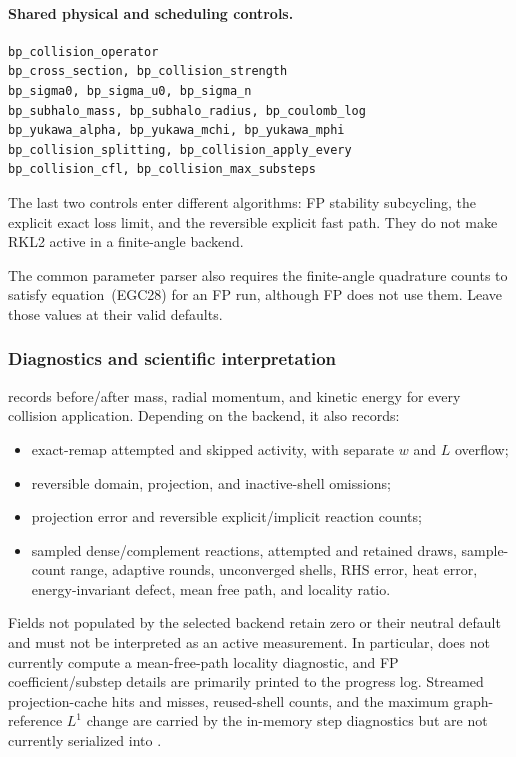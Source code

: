 \paragraph{Shared physical and scheduling controls.}
\begin{lstlisting}
bp_collision_operator
bp_cross_section, bp_collision_strength
bp_sigma0, bp_sigma_u0, bp_sigma_n
bp_subhalo_mass, bp_subhalo_radius, bp_coulomb_log
bp_yukawa_alpha, bp_yukawa_mchi, bp_yukawa_mphi
bp_collision_splitting, bp_collision_apply_every
bp_collision_cfl, bp_collision_max_substeps
\end{lstlisting}
The last two controls enter different algorithms: FP stability subcycling,
the explicit exact loss limit, and the reversible explicit fast path.  They
do not make RKL2 active in a finite-angle backend.

The common parameter parser also requires the finite-angle quadrature counts
to satisfy equation~(EGC28) for an FP run, although FP does not use them.
Leave those values at their valid defaults.

\subsubsection{Diagnostics and scientific interpretation}

 records before/after mass, radial momentum,
and kinetic energy for every collision application.  Depending on the
backend, it also records:
\begin{itemize}
\item exact-remap attempted and skipped activity, with separate \(w\) and
      \(L\) overflow;
\item reversible domain, projection, and inactive-shell omissions;
\item projection error and reversible explicit/implicit reaction counts;
\item sampled dense/complement reactions, attempted and retained draws,
      sample-count range, adaptive rounds, unconverged shells, RHS error, heat
      error, energy-invariant defect, mean free path, and locality ratio.
\end{itemize}
Fields not populated by the selected backend retain zero or their neutral
default and must not be interpreted as an active measurement.  In particular,
 does not currently compute a mean-free-path locality
diagnostic, and FP coefficient/substep details are primarily printed to the
progress log.  Streamed projection-cache hits and misses, reused-shell counts,
and the maximum graph-reference \(L^1\) change are carried by the in-memory
step diagnostics but are not currently serialized into
.


